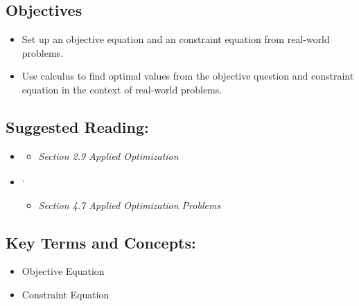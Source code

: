 \vspace{-0.25 in}
\begin{framed}
\subsection*{Objectives}
\begin{itemize}
    \item Set up an objective equation and an constraint equation from real-world problems.
    \item Use calculus to find optimal values from the objective question and constraint equation in the context of real-world problems.
\end{itemize}

\subsection*{Suggested Reading:}
\begin{itemize}
\item \cite{Calaway}\footnotemark[1]
   \begin{itemize}
        \item \emph{Section 2.9 Applied Optimization}
    \end{itemize}

\item \cite{openstax}\footnotemark[2]\textsuperscript{,}\footnotemark[3]
    \begin{itemize}
        \item \emph{Section 4.7 Applied Optimization Problems}
    \end{itemize}

\end{itemize}
\subsection*{Key Terms and Concepts:} 

\begin{multicols}{2}
\begin{itemize}
    \item Objective Equation
    \item Constraint Equation
    
\end{itemize}
\end{multicols}
\end{framed}

